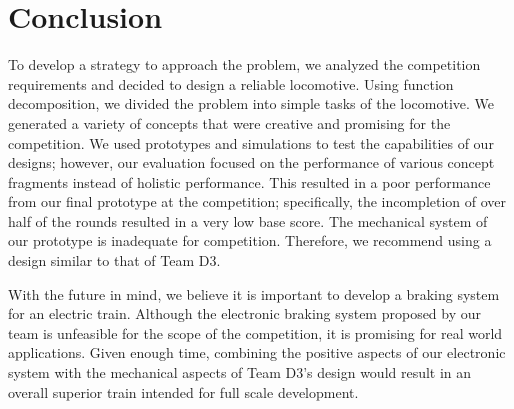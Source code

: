 \documentclass[class=../report, crop=false]{standalone}
\begin{document}
\section{Conclusion}

To develop a strategy to approach the problem, we analyzed the competition requirements and decided to design a reliable locomotive.
Using function decomposition, we divided the problem into simple tasks of the locomotive.
We generated a variety of concepts that were creative and promising for the competition.
We used prototypes and simulations to test the capabilities of our designs; however, our evaluation focused on the performance of various concept fragments instead of holistic performance.
This resulted in a poor performance from our final prototype at the competition; specifically, the incompletion of over half of the rounds resulted in a very low base score.
The mechanical system of our prototype is inadequate for competition.
Therefore, we recommend using a design similar to that of Team D3.

With the future in mind, we believe it is important to develop a braking system for an electric train.
Although the electronic braking system proposed by our team is unfeasible for the scope of the competition, it is promising for real world applications.
Given enough time, combining the positive aspects of our electronic system with the mechanical aspects of Team D3’s design would result in an overall superior train intended for full scale development.
\end{document}
